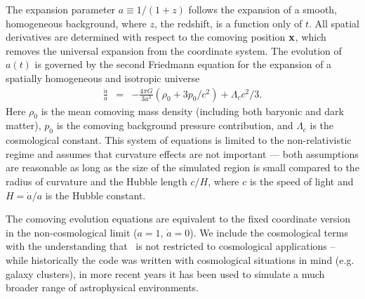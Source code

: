 The expansion parameter $a \equiv 1/(1 + z)$ follows the expansion of
a smooth, homogeneous background, where $z$, the redshift, is a
function only of $t$.  All spatial derivatives are determined with
respect to the comoving position $\mathbf{x}$, which removes the universal
expansion from the coordinate system. The evolution of $a(t)$ is
governed by the second Friedmann equation for the expansion of a
spatially homogeneous and isotropic universe
%
\begin{eqnarray}
\frac{\ddot{a}}{a} & = & 
      - \frac{4 \pi G }{3 a^3 } (\rho_0 
      + 3p_0/c^2) 
      + \Lambda_c c^2 / 3 .
      \label{eq:expansion} 
\end{eqnarray}
%
Here $\rho_0$ is the mean comoving mass density (including both
baryonic and dark matter), $p_0$ is the comoving background pressure
contribution, and $\Lambda_c$ is the cosmological constant.
This system of equations is limited to the non-relativistic regime and
assumes that curvature effects are not important --- both assumptions
are reasonable as long as the size of the simulated region is small
compared to the radius of curvature and the Hubble length $c/H$, where
$c$ is the speed of light and $H = \dot{a}/a$ is the Hubble constant.

The comoving evolution equations are equivalent to the fixed
coordinate version in the non-cosmological limit ($a = 1$, $\dot{a} =
0$).  We include the cosmological terms with the understanding that
\enzo\ is not restricted to cosmological applications -- while
historically the code was written with cosmological situations in mind
(e.g. galaxy clusters), in more recent years it has been used to
simulate a much broader range of astrophysical environments.


